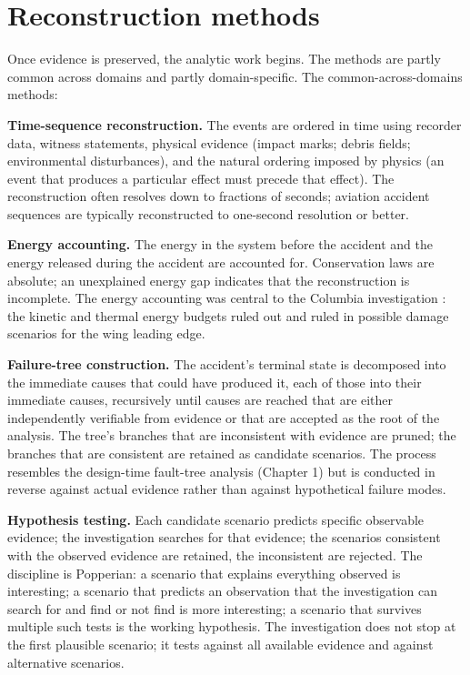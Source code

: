 \section{Reconstruction methods}

Once evidence is preserved, the analytic work begins. The methods are partly common across domains and partly domain-specific. The common-across-domains methods:

\textbf{Time-sequence reconstruction.} The events are ordered in time using recorder data, witness statements, physical evidence (impact marks; debris fields; environmental disturbances), and the natural ordering imposed by physics (an event that produces a particular effect must precede that effect). The reconstruction often resolves down to fractions of seconds; aviation accident sequences are typically reconstructed to one-second resolution or better.

\textbf{Energy accounting.} The energy in the system before the accident and the energy released during the accident are accounted for. Conservation laws are absolute; an unexplained energy gap indicates that the reconstruction is incomplete. The energy accounting was central to the Columbia investigation \cite{acc:caib-columbia}: the kinetic and thermal energy budgets ruled out and ruled in possible damage scenarios for the wing leading edge.

\textbf{Failure-tree construction.} The accident's terminal state is decomposed into the immediate causes that could have produced it, each of those into their immediate causes, recursively until causes are reached that are either independently verifiable from evidence or that are accepted as the root of the analysis. The tree's branches that are inconsistent with evidence are pruned; the branches that are consistent are retained as candidate scenarios. The process resembles the design-time fault-tree analysis (Chapter 1) but is conducted in reverse against actual evidence rather than against hypothetical failure modes.

\textbf{Hypothesis testing.} Each candidate scenario predicts specific observable evidence; the investigation searches for that evidence; the scenarios consistent with the observed evidence are retained, the inconsistent are rejected. The discipline is Popperian: a scenario that explains everything observed is interesting; a scenario that predicts an observation that the investigation can search for and find or not find is more interesting; a scenario that survives multiple such tests is the working hypothesis. The investigation does not stop at the first plausible scenario; it tests against all available evidence and against alternative scenarios.


